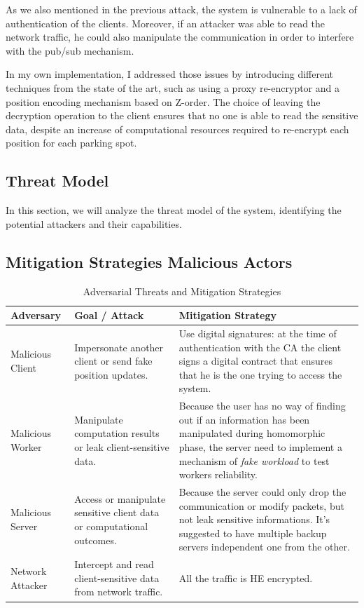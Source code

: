 As we also mentioned in the previous attack, the system is vulnerable to a lack of authentication of the clients. Moreover, if an attacker was able to read the network traffic, he could also manipulate the communication in order to interfere with the pub/sub mechanism.

In my own implementation, I addressed those issues by introducing different techniques from the state of the art, such as using a proxy re-encryptor and a position encoding mechanism based on Z-order. The choice of leaving the decryption operation to the client ensures that no one is able to read the sensitive data, despite an increase of computational resources required to re-encrypt each position for each parking spot.

\subsection{Threat Model}

In this section, we will analyze the threat model of the system, identifying the potential attackers and their capabilities. 


\subsection{Mitigation Strategies Malicious Actors}

\begin{table}[h]
\renewcommand{\arraystretch}{1.3}
\small
\begin{tabularx}{\linewidth}{|l|X|X|}
\hline
\textbf{Adversary} & \textbf{Goal / Attack} & \textbf{Mitigation Strategy} \\ \hline

Malicious Client &
Impersonate another client or send fake position updates. &
Use digital signatures: at the time of authentication with the CA the client signs a digital contract that ensures that he is the one trying to access the system. \\ \hline

Malicious Worker &
Manipulate computation results or leak client-sensitive data. &
Because the user has no way of finding out if an information has been manipulated during homomorphic phase, the server need to implement a mechanism of \emph{fake workload} to test workers reliability. \\ \hline

Malicious Server &
Access or manipulate sensitive client data or computational outcomes. &
Because the server could only drop the communication or modify packets, but not leak sensitive informations. It's suggested to have multiple backup servers independent one from the other. \\ \hline

Network Attacker &
Intercept and read client-sensitive data from network traffic. &
All the traffic is HE encrypted. \\ \hline

\end{tabularx}
\caption{Adversarial Threats and Mitigation Strategies}
\label{table:adversaries}
\end{table}

